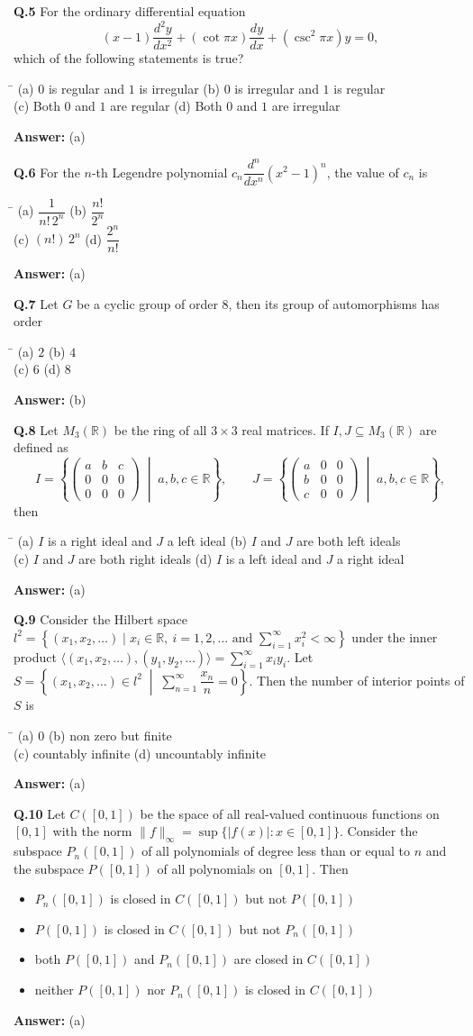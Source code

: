 \documentclass[11pt,a4paper]{article}
\newcommand{\optsfour}[4]{%
  \begin{tabbing}
    \hspace{0.48\linewidth}\=\kill
    (a) #1 \> (b) #2 \\[2pt]
    (c) #3 \> (d) #4
  \end{tabbing}%
}
\newcommand{\optslist}[4]{%
  \begin{itemize}
    \setlength{\itemsep}{2pt}\setlength{\parskip}{0pt}
    \item[(a)] #1
    \item[(b)] #2
    \item[(c)] #3
    \item[(d)] #4
  \end{itemize}%
}
\newcommand{\ans}[1]{\textbf{Answer:} #1\par\medskip}
\begin{document}
\textbf{Q.5} For the ordinary differential equation
\[
  (x - 1)\frac{d^2 y}{dx^2} + (\cot \pi x)\frac{dy}{dx} + (\csc^2 \pi x)y = 0,
\]
which of the following statements is true?
\optsfour{$0$ is regular and $1$ is irregular}{$0$ is irregular and $1$ is regular}{Both $0$ and $1$ are regular}{Both $0$ and $1$ are irregular}
\ans{(a)}

\textbf{Q.6} For the $n$-th Legendre polynomial $c_n \dfrac{d^n}{dx^n}(x^2 - 1)^n$, the value of $c_n$ is
\optsfour{$\dfrac{1}{n!\,2^n}$}{$\dfrac{n!}{2^n}$}{$(n!)\,2^n$}{$\dfrac{2^n}{n!}$}
\ans{(a)}

\textbf{Q.7} Let $G$ be a cyclic group of order $8$, then its group of automorphisms has order
\optsfour{$2$}{$4$}{$6$}{$8$}
\ans{(b)}

\textbf{Q.8} Let $M_3(\mathbb{R})$ be the ring of all $3 \times 3$ real matrices. If $I, J \subseteq M_3(\mathbb{R})$ are defined as
\[
  I = \left\{\begin{pmatrix} a & b & c \\ 0 & 0 & 0 \\ 0 & 0 & 0 \end{pmatrix} \;\middle|\; a, b, c \in \mathbb{R}\right\},
  \qquad
  J = \left\{\begin{pmatrix} a & 0 & 0 \\ b & 0 & 0 \\ c & 0 & 0 \end{pmatrix} \;\middle|\; a, b, c \in \mathbb{R}\right\},
\]
then
\optsfour{$I$ is a right ideal and $J$ a left ideal}{$I$ and $J$ are both left ideals}{$I$ and $J$ are both right ideals}{$I$ is a left ideal and $J$ a right ideal}
\ans{(a)}

\textbf{Q.9} Consider the Hilbert space $l^2 = \left\{(x_1, x_2, \dots) \mid x_i \in \mathbb{R},\ i = 1, 2, \dots \text{ and } \sum_{i=1}^{\infty} x_i^2 < \infty\right\}$ under the inner product $\langle (x_1, x_2, \dots), (y_1, y_2, \dots) \rangle = \sum_{i=1}^{\infty} x_i y_i$. Let $S = \left\{(x_1, x_2, \dots) \in l^2 \;\middle|\; \sum_{n=1}^{\infty} \dfrac{x_n}{n} = 0\right\}$. Then the number of interior points of $S$ is
\optsfour{$0$}{non zero but finite}{countably infinite}{uncountably infinite}
\ans{(a)}

\textbf{Q.10} Let $C([0,1])$ be the space of all real-valued continuous functions on $[0, 1]$ with the norm $\|f\|_\infty = \sup\{|f(x)| : x \in [0, 1]\}$. Consider the subspace $P_n([0,1])$ of all polynomials of degree less than or equal to $n$ and the subspace $P([0,1])$ of all polynomials on $[0, 1]$. Then
\optslist{$P_n([0,1])$ is closed in $C([0,1])$ but not $P([0,1])$}{$P([0,1])$ is closed in $C([0,1])$ but not $P_n([0,1])$}{both $P([0,1])$ and $P_n([0,1])$ are closed in $C([0,1])$}{neither $P([0,1])$ nor $P_n([0,1])$ is closed in $C([0,1])$}
\ans{(a)}
\end{document}
